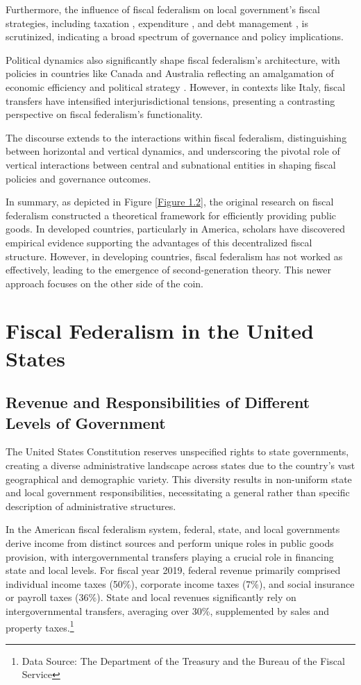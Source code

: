Furthermore, the influence of fiscal federalism on local government's fiscal strategies, including taxation \parencite{mogues2012external}, expenditure \parencite{hines1995anomalies}, and debt management \parencite{qian1998federalism}, is scrutinized, indicating a broad spectrum of governance and policy implications.

Political dynamics also significantly shape fiscal federalism's architecture, with policies in countries like Canada and Australia reflecting an amalgamation of economic efficiency and political strategy \parencite{oates2005toward}. However, in contexts like Italy, fiscal transfers have intensified interjurisdictional tensions, presenting a contrasting perspective on fiscal federalism's functionality.

The discourse extends to the interactions within fiscal federalism, distinguishing between horizontal and vertical dynamics, and underscoring the pivotal role of vertical interactions between central and subnational entities in shaping fiscal policies and governance outcomes.

In summary, as depicted in Figure \ref*{Figure 1.2}, the original research on fiscal federalism constructed a theoretical framework for efficiently providing public goods. In developed countries, particularly in America, scholars have discovered empirical evidence supporting the advantages of this decentralized fiscal structure. However, in developing countries, fiscal federalism has not worked as effectively, leading to the emergence of second-generation theory. This newer approach focuses on the other side of the coin.


\section{Fiscal Federalism in the United States}

\subsection{Revenue and Responsibilities of Different Levels of Government}
The United States Constitution reserves unspecified rights to state governments, creating a diverse administrative landscape across states due to the country's vast geographical and demographic variety. This diversity results in non-uniform state and local government responsibilities, necessitating a general rather than specific description of administrative structures.

In the American fiscal federalism system, federal, state, and local governments derive income from distinct sources and perform unique roles in public goods provision, with intergovernmental transfers playing a crucial role in financing state and local levels. For fiscal year 2019, federal revenue primarily comprised individual income taxes (50\%), corporate income taxes (7\%), and social insurance or payroll taxes (36\%). State and local revenues significantly rely on intergovernmental transfers, averaging over 30\%, supplemented by sales and property taxes.\footnote[1]{Data Source: The Department of the Treasury and the Bureau of the Fiscal Service}

